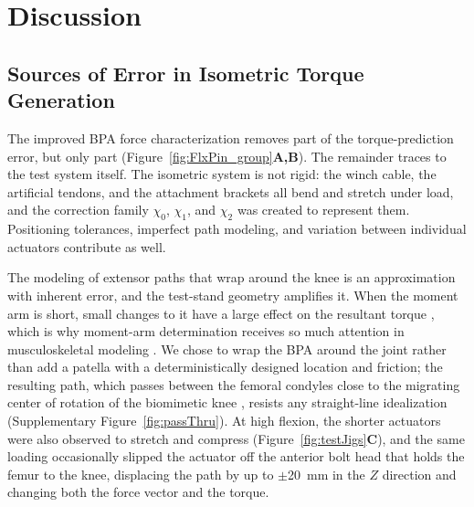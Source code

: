 
\section{Discussion}\label{sec:discussion}

\subsection{Sources of Error in Isometric Torque Generation}\label{sec:disc_error}

The improved BPA force characterization removes part of the torque-prediction error, but only part (Figure~\ref{fig:FlxPin_group}\textbf{A,B}). The remainder traces to the test system itself. The isometric system is not rigid: the winch cable, the artificial tendons, and the attachment brackets all bend and stretch under load, and the correction family $\chi_{0}$, $\chi_{1}$, and $\chi_{2}$ was created to represent them. Positioning tolerances, imperfect path modeling, and variation between individual actuators contribute as well.

The modeling of extensor paths that wrap around the knee is an approximation with inherent error, and the test-stand geometry amplifies it. When the moment arm is short, small changes to it have a large effect on the resultant torque \citep{young_analyzing_2019}, which is why moment-arm determination receives so much attention in musculoskeletal modeling \citep{brand_model_1982, menegaldo_moment_2004, suderman_moving_2012}. We chose to wrap the BPA around the joint rather than add a patella with a deterministically designed location and friction; the resulting path, which passes between the femoral condyles close to the migrating center of rotation of the biomimetic knee \citep{steele_biomimetic_2018}, resists any straight-line idealization (Supplementary Figure~\ref{fig:passThru}). At high flexion, the shorter actuators were also observed to stretch and compress (Figure~\ref{fig:testJigs}\textbf{C}), and the same loading occasionally slipped the actuator off the anterior bolt head that holds the femur to the knee, displacing the path by up to $\pm$\qty{20}{\mm} in the $Z$ direction and changing both the force vector and the torque.

